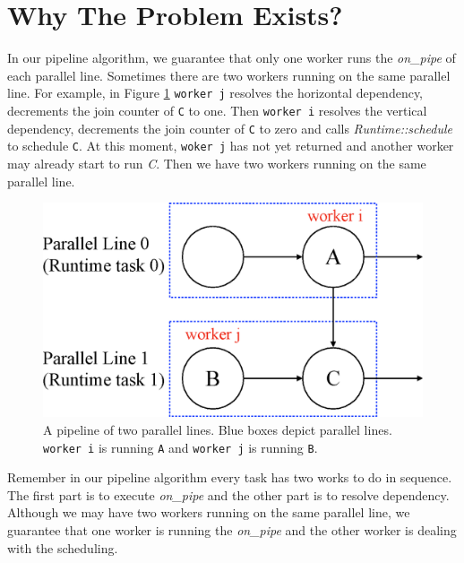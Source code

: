 \documentclass[11pt,twoside]{article}
\theoremstyle{plain}
\theoremstyle{definition}
\theoremstyle{remark}
\begin{document}



\section{Why The Problem Exists?}

In our pipeline algorithm, we guarantee that only one worker
runs the \textit{on\_pipe} of each parallel line.
Sometimes there are two workers running on the
same parallel line.
For example, in Figure \ref{fig::pipeline} \texttt{worker j} resolves
the horizontal dependency, decrements the join counter of \texttt{C} to one.
Then \texttt{worker i} resolves the vertical dependency, decrements the
join counter of \texttt{C} to zero and calls \textit{Runtime::schedule} to schedule
\texttt{C}.
At this moment, \texttt{woker j} has not yet returned and another worker
may already start to run \textit{C}.
Then we have two workers running on the same parallel line.

\begin{figure}[!h]
  \centering
  \centerline{\includegraphics[width=.5\columnwidth]{Figure/pipeline.eps}}
  \caption{
    A pipeline of two parallel lines. Blue boxes depict parallel lines.
    \texttt{worker i} is running \texttt{A} and \texttt{worker j} is running \texttt{B}.
  }
  \label{fig::pipeline}
\end{figure}

Remember in our pipeline algorithm every task has two works to do in sequence.
The first part is to execute \textit{on\_pipe}
and the other part is to resolve dependency.
Although we may have two workers running on the same parallel line,
we guarantee that one worker is running the \textit{on\_pipe} and
the other worker is dealing with the scheduling.
\end{document}
